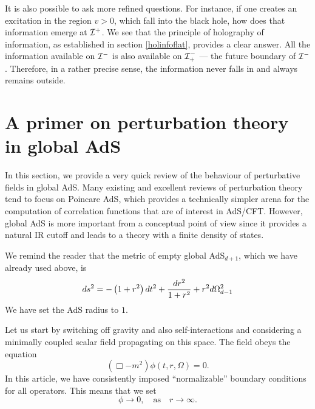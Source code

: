 \documentclass[12pt]{article}
\newcommand{\be}{\begin{equation}}
\newcommand{\ee}{\end{equation}}
\def \scrip{{\cal I}^{+}}
\def \scrim{{\cal I}^{-}}
\def \scrimfuture{{\cal I}^{-}_{+}}
\begin{document}
It is also possible to ask more refined questions. For instance, if one creates an excitation in the region $v > 0$, which fall into the black hole, how does that information emerge at $\scrip$. We see that the principle of holography of information, as established in section \ref{holinfoflat}, provides a clear answer. All the information available on $\scrim$ is also available on $\scrimfuture$ --- the future boundary of $\scrim$. Therefore, in a rather precise sense, the information never falls in and always remains outside.

















\section{A primer on perturbation theory in global AdS \label{appadspert}}
In this section, we provide a very quick review of the behaviour of perturbative fields in global AdS. Many existing and excellent reviews of perturbation theory \cite{Aharony:1999ti,D'Hoker:2002aw} tend to focus on Poincare AdS, which provides a technically simpler arena for the computation of correlation functions that are of interest in AdS/CFT. However, global AdS is more important from a conceptual point of view since it provides a natural IR cutoff and leads to a theory with a finite density of states.

We remind the reader that the metric of empty global AdS$_{d+1}$, which we have already used above, is
\be
\label{emptyglobaladsapp}
ds^2 = -\left(1+r^2\right) dt^2
+{ dr^2 \over 1+r^2} + r^2 d\Omega_{d-1}^2
\ee
We have set the AdS radius to $1$.

Let us start by switching off gravity and also self-interactions and considering a minimally coupled scalar field propagating on this space. The field obeys the equation
\be
\left( \Box - m^2 \right) \phi(t, r, \Omega) = 0.
\ee
In this article, we have consistently imposed ``normalizable'' boundary conditions for all operators. This means that we set
\be
\label{boundcond}
\phi \rightarrow 0, \quad \text{as} \quad r \rightarrow \infty.
\ee
\end{document}
